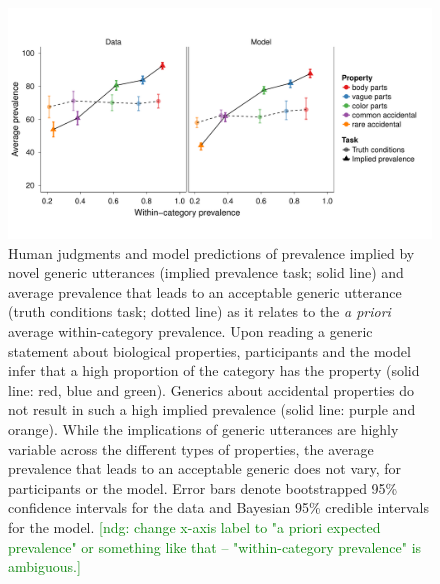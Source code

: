\documentclass[10pt,letterpaper]{article}
\newcommand{\ndg}[1]{\textcolor{Green}{[ndg: #1]}}
\begin{document}
\begin{figure}
\centering
    \includegraphics[width=1\columnwidth]{asym-lines-data-model-2phi-2so-50kx3.pdf}
    \caption{Human judgments and model predictions of prevalence implied by novel generic utterances (implied prevalence task; solid line) and average prevalence that leads to an acceptable generic utterance (truth conditions task; dotted line) as it relates to the \emph{a priori} average within-category prevalence.
    Upon reading a generic statement about biological properties, participants and the model infer that a high proportion of the category has the property (solid line: red, blue and green). 
    Generics about accidental properties do not result in such a high implied prevalence (solid line: purple and orange).  
	While the implications of generic utterances are highly variable across the different types of properties, the average prevalence that leads to an acceptable generic does not vary, for  participants or the model.
    Error bars denote bootstrapped 95\% confidence intervals for the data and Bayesian 95\% credible intervals for the model.
    \ndg{change x-axis label to "a priori expected prevalence" or something like that -- "within-category prevalence" is ambiguous.}
    }
  \label{fig:exp2b}
\end{figure}


\end{document}
